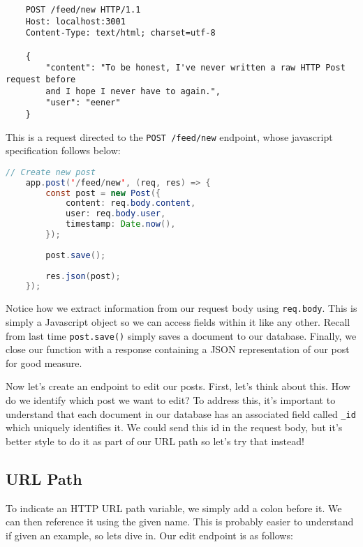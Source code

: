 \begin{verbatim}
    POST /feed/new HTTP/1.1
    Host: localhost:3001
    Content-Type: text/html; charset=utf-8

    {
        "content": "To be honest, I've never written a raw HTTP Post request before 
        and I hope I never have to again.",
        "user": "eener"
    }
\end{verbatim}

This is a request directed to the \texttt{POST /feed/new} endpoint, whose javascript specification follows below:

\begin{lstlisting}[language=Java]
    // Create new post
    app.post('/feed/new', (req, res) => {
        const post = new Post({
            content: req.body.content,
            user: req.body.user,
            timestamp: Date.now(),
        });
    
        post.save();
    
        res.json(post);
    });
\end{lstlisting}

Notice how we extract information from our request body using \texttt{req.body}. This is simply a Javascript object so we can access fields within it like any other. Recall from last time \texttt{post.save()} simply saves a document to our database. Finally, we close our function with a response containing a JSON representation of our post for good measure.

Now let's create an endpoint to edit our posts. First, let's think about this. How do we identify which post we want to edit? To address this, it's important to understand that each document in our database has an associated field called \texttt{\_id} which uniquely identifies it. We could send this id in the request body, but it's better style to do it as part of our URL path so let's try that instead!

\subsection*{URL Path}
To indicate an HTTP URL path variable, we simply add a colon before it. We can then reference it using the given name. This is probably easier to understand if given an example, so lets dive in. Our edit endpoint is as follows:

